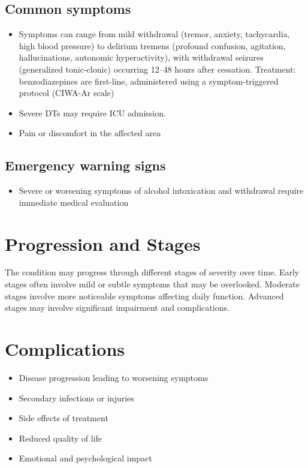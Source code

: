 \subsection{Common symptoms}
\begin{itemize}[noitemsep]
  \item Symptoms can range from mild withdrawal (tremor, anxiety, tachycardia, high blood pressure) to delirium tremens (profound confusion, agitation, hallucinations, autonomic hyperactivity), with withdrawal seizures (generalized tonic-clonic) occurring 12--48 hours after cessation. Treatment: benzodiazepines are first-line, administered using a symptom-triggered protocol (CIWA-Ar scale)
  \item Severe DTs may require ICU admission.
  \item Pain or discomfort in the affected area
  \end{itemize}

\subsection{Emergency warning signs}
\begin{itemize}[noitemsep]
  \item Severe or worsening symptoms of alcohol intoxication and withdrawal require immediate medical evaluation
\end{itemize}
\section{Progression and Stages}
The condition may progress through different stages of severity over time. Early stages often involve mild or subtle symptoms that may be overlooked. Moderate stages involve more noticeable symptoms affecting daily function. Advanced stages may involve significant impairment and complications.
\section{Complications}
\begin{itemize}[noitemsep]
  \item Disease progression leading to worsening symptoms
  \item Secondary infections or injuries
  \item Side effects of treatment
  \item Reduced quality of life
  \item Emotional and psychological impact
\end{itemize}
